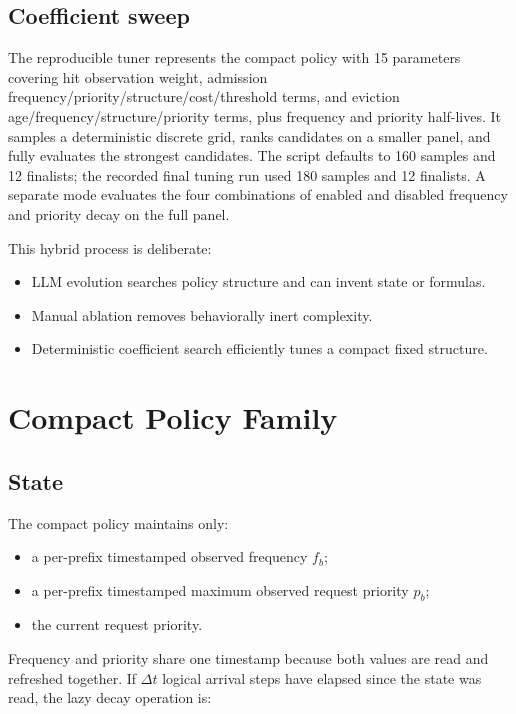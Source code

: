 \documentclass[11pt]{article}
\newcommand{\code}[1]{\texttt{\detokenize{#1}}}
\begin{document}
\subsection{Coefficient sweep}

The reproducible tuner represents the compact policy with 15 parameters covering hit
observation weight, admission frequency/priority/structure/cost/threshold terms, and
eviction age/frequency/structure/priority terms, plus frequency and priority half-lives.
It samples a deterministic discrete grid, ranks candidates on a smaller panel, and
fully evaluates the strongest candidates.  The script defaults to 160 samples and 12
finalists; the recorded final tuning run used 180 samples and 12 finalists.  A separate
\code{--decay-ablation} mode evaluates the four combinations of enabled and disabled
frequency and priority decay on the full panel.

This hybrid process is deliberate:

\begin{itemize}
  \item LLM evolution searches policy structure and can invent state or formulas.
  \item Manual ablation removes behaviorally inert complexity.
  \item Deterministic coefficient search efficiently tunes a compact fixed structure.
\end{itemize}

\section{Compact Policy Family}

\subsection{State}

The compact policy maintains only:

\begin{itemize}
  \item a per-prefix timestamped observed frequency \(f_b\);
  \item a per-prefix timestamped maximum observed request priority \(p_b\);
  \item the current request priority.
\end{itemize}

Frequency and priority share one timestamp because both values are read and refreshed
together.  If \(\Delta t\) logical arrival steps have elapsed since the state was read,
the lazy decay operation is:
\end{document}
